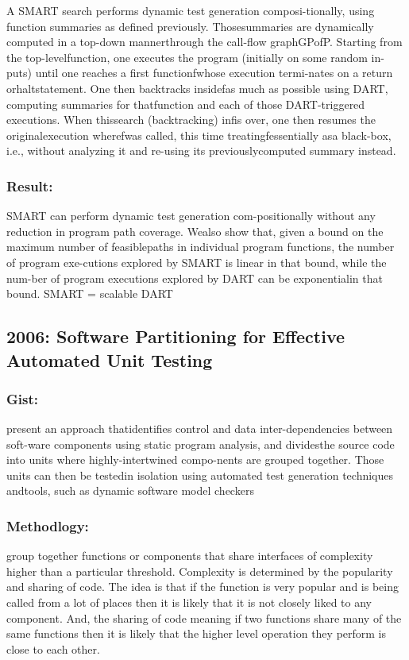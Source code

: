 \documentclass[	runningheads,
				a4paper]{llncs}
\begin{document}
A SMART search performs dynamic test generation composi-tionally,  using  function  summaries  as  defined  previously.  Thosesummaries  are  dynamically  computed  in  a  top-down  mannerthrough the call-flow graphGPofP. Starting from the top-levelfunction, one executes the program (initially on some random in-puts) until one  reaches  a first functionfwhose execution termi-nates on a return orhaltstatement. One then backtracks insidefas much as  possible  using DART, computing summaries  for thatfunction and each of those DART-triggered executions. When thissearch (backtracking)  infis over, one then resumes the originalexecution wherefwas called,  this time treatingfessentially asa black-box,  i.e., without analyzing it and re-using its previouslycomputed  summary  instead. 

\subsubsection{Result:}
SMART can perform dynamic test generation com-positionally without any reduction in program path coverage. Wealso show that, given a bound on the maximum number of feasiblepaths in individual program functions, the number of program exe-cutions explored by SMART is linear in that bound, while the num-ber of program executions explored by DART can be exponentialin that bound.
SMART = scalable DART


\subsection{2006: Software Partitioning for Effective Automated Unit Testing}
\cite{chakrabarti2006software}

\subsubsection{Gist:}
present an approach thatidentifies control and data inter-dependencies between soft-ware components using static program analysis, and dividesthe source code into units where highly-intertwined compo-nents are grouped together. Those units can then be testedin isolation using automated test generation techniques andtools,  such as dynamic software model checkers

\subsubsection{Methodlogy:}
group together functions or components that share interfaces of complexity higher than 
a particular threshold. Complexity is determined by the popularity and sharing of code. The idea is that 
if the function is very popular and is being called from a lot of places then it is likely that it is not closely liked to any component. 
And, the sharing of code meaning if two functions share many of the same functions then it is likely that the higher level operation they perform is close to each other.
\end{document}
